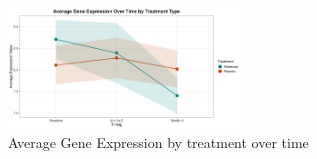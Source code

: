 \documentclass{report}
\begin{document}
\begin{figure}[ht] 
	\centering
	\includegraphics[width=0.55\textwidth]{Figures/Application/descriptive_statistics/expression_behaviour.png}
	\caption{Average Gene Expression by treatment over time}
	\label{fig:gene-expression}
\end{figure}

\setlength{\tabcolsep}{1pt} %
\renewcommand{\arraystretch}{1.5} %
\end{document}
